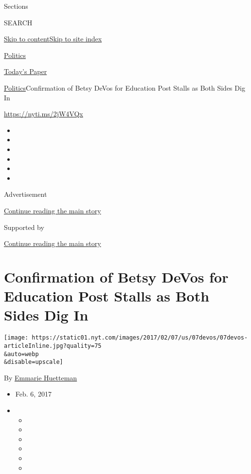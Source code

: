 Sections

SEARCH

\protect\hyperlink{site-content}{Skip to
content}\protect\hyperlink{site-index}{Skip to site index}

\href{https://www.nytimes.com/section/politics}{Politics}

\href{https://myaccount.nytimes.com/auth/login?response_type=cookie\&client_id=vi}{}

\href{https://www.nytimes.com/section/todayspaper}{Today's Paper}

\href{/section/politics}{Politics}\textbar{}Confirmation of Betsy DeVos
for Education Post Stalls as Both Sides Dig In

\url{https://nyti.ms/2jW4VQx}

\begin{itemize}
\item
\item
\item
\item
\item
\item
\end{itemize}

Advertisement

\protect\hyperlink{after-top}{Continue reading the main story}

Supported by

\protect\hyperlink{after-sponsor}{Continue reading the main story}

\hypertarget{confirmation-of-betsy-devos-for-education-post-stalls-as-both-sides-dig-in}{%
\section{Confirmation of Betsy DeVos for Education Post Stalls as Both
Sides Dig
In}\label{confirmation-of-betsy-devos-for-education-post-stalls-as-both-sides-dig-in}}

\texttt{[image: https://static01.nyt.com/images/2017/02/07/us/07devos/07devos-articleInline.jpg?quality=75\\\&auto=webp\\\&disable=upscale]}

By \href{https://www.nytimes.com/by/emmarie-huetteman}{Emmarie
Huetteman}

\begin{itemize}
\item
  Feb. 6, 2017
\item
  \begin{itemize}
  \item
  \item
  \item
  \item
  \item
  \item
  \end{itemize}
\end{itemize}

